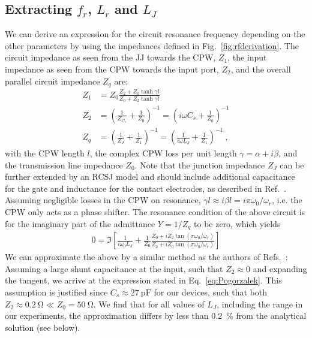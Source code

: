 \subsection{Extracting $f_r$, $L_r$ and $L_J$}\label{sec:SMcalibration}

We can derive an expression for the circuit resonance frequency depending on the other parameters by using the impedances defined in Fig.~\ref{fig:rfderivation}.
%
The circuit impedance as seen from the JJ towards the CPW, $Z_1$, the input impedance as seen from the CPW towards the input port, $Z_2$, and the overall parallel circuit impedance $Z_q$ are:
%
\begin{align}
Z_1 &= Z_0 \frac{Z_2+Z_0\tanh\gamma l}{Z_0+Z_2\tanh\gamma l} \\
Z_2 &= \left(\frac{1}{Z_{C_s}}+\frac{1}{Z_0}\right)^{-1} = \left(i\omega C_s+\frac{1}{Z_0}\right)^{-1} \\
Z_q &= \left(\frac{1}{Z_{J}}+\frac{1}{Z_1}\right)^{-1} = \left(\frac{1}{i\omega L_J}+\frac{1}{Z_1}\right)^{-1}\ ,
\end{align}
%
with the CPW length $l$, the complex CPW loss per unit length $\gamma=\alpha+i\beta$, and the transmission line impedance $Z_0$.
%
Note that the junction impedance $Z_J$ can be further extended by an RCSJ model and should include additional capacitance for the gate and inductance for the contact electrodes, as described in Ref.~\cite{schmidtBallisticGrapheneSuperconducting2018}.
%
Assuming negligible losses in the CPW on resonance, $\gamma l\approx i\beta l = i\pi\omega_0/\omega_r$, i.e. the CPW only acts as a phase shifter.
%
The resonance condition of the above circuit is for the imaginary part of the admittance $Y=1/Z_q$ to be zero, which yields
%
\begin{align}
0 = \Im \left[ \frac{1}{i\omega_0 L_J} + \frac{1}{Z_0}\frac{Z_0+iZ_2\tan\left(\pi\omega_0/\omega_r\right)}{Z_2+iZ_0\tan\left(\pi\omega_0/\omega_r\right)}\right]
\label{eq:SolAnalytical}
\end{align}
%
%
We can approximate the above by a similar method as the authors of Refs.~\cite{wallquistSelectiveCouplingSuperconducting2006a,wustmannParametricResonanceTunable2013,pogorzalekHystereticFluxResponse2017}:
%
Assuming a large shunt capacitance at the input, such that $Z_2\approx 0$ and expanding the tangent, we arrive at the expression stated in Eq.~\ref{eq:Pogorzalek}.%
%
This assumption is justified since $C_s\approx\SI{27}{\pico\farad}$ for our devices, such that both $Z_2\approx \SI{0.2}{\ohm} \ll Z_0=\SI{50}{\ohm}$.
%
We find that for all values of $L_J$, including the range in our experiments, the approximation differs by less than \SI{0.2}{\percent} from the analytical solution (see below).


